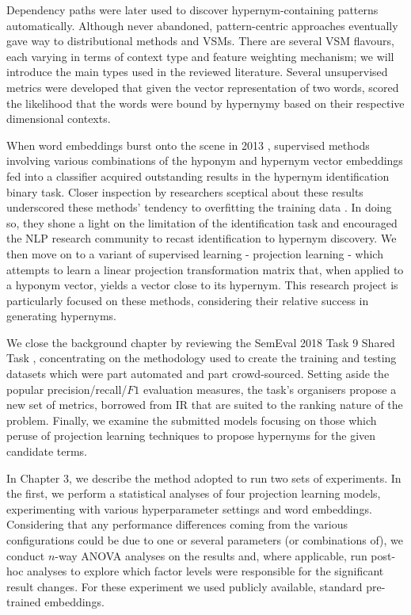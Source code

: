 Dependency paths were later used to discover hypernym-containing patterns automatically.  Although never abandoned, pattern-centric approaches eventually gave way to distributional methods and \acl{VSM}s.  There are several \ac{VSM} flavours, each varying in terms of context type and feature weighting mechanism; we will introduce the main types used in the reviewed literature.  Several unsupervised metrics were developed that given the vector representation of two words, scored the likelihood that the words were bound by hypernymy based on their respective dimensional contexts.

When word embeddings burst onto the scene in 2013 \citep{mikolov2013distributed}, supervised methods involving various combinations of the hyponym and hypernym vector embeddings fed into a classifier acquired outstanding results in the hypernym identification binary task.  Closer inspection by researchers sceptical about these results underscored these methods’ tendency to overfitting the training data \citep{levy2015supervised, santus2016nine}. In doing so, they shone a light on the limitation of the identification task and encouraged the NLP research community to recast identification to hypernym discovery.  We then move on to a variant of supervised learning - projection learning - which attempts to learn a linear projection transformation matrix that, when applied to a hyponym vector, yields a vector close to its hypernym.  This research project is particularly focused on these methods, considering their relative success in generating hypernyms.  

We close the background chapter by reviewing the SemEval 2018 Task 9 Shared Task \citep{camacho2018semeval}, concentrating on the methodology used to create the training and testing datasets which were part automated and part crowd-sourced.  Setting aside the popular precision/recall/\(F1\) evaluation measures, the task’s organisers propose a new set of metrics, borrowed from \ac{IR} that are suited to the ranking nature of the problem.  Finally, we examine the submitted models focusing on those which peruse of projection learning techniques to propose hypernyms for the given candidate terms.

In Chapter 3, we describe the method adopted to run two sets of experiments.  In the first, we perform a statistical analyses of four projection learning models, experimenting with various hyperparameter settings and word embeddings.  Considering that any performance differences coming from the various configurations could be due to one or several parameters (or combinations of), we conduct $n$-way \ac{ANOVA} analyses on the results and, where applicable, run post-hoc analyses to explore which factor levels were responsible for the significant result changes.  For these experiment we used publicly available, standard pre-trained embeddings.

